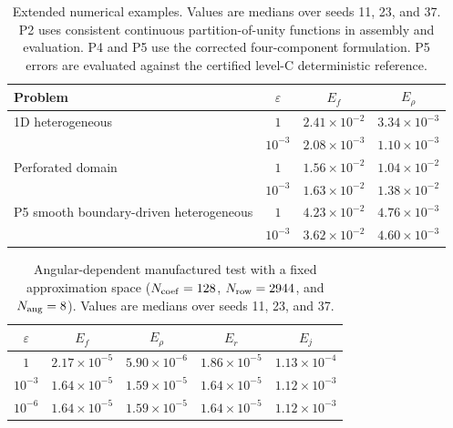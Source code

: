 \begin{table}[t]
\centering
\caption{Extended numerical examples. Values are medians over seeds 11, 23, and 37. P2 uses consistent continuous partition-of-unity functions in assembly and evaluation. P4 and P5 use the corrected four-component formulation. P5 errors are evaluated against the certified level-C deterministic reference.}
\label{tab:extended}
\begin{tabular}{lccc}
\toprule
Problem & $\varepsilon$ & $E_f$ & $E_\rho$\\
\midrule
1D heterogeneous & $1$ & $2.41\times10^{-2}$ & $3.34\times10^{-3}$\\
 & $10^{-3}$ & $2.08\times10^{-3}$ & $1.10\times10^{-3}$\\
\midrule
Perforated domain & $1$ & $1.56\times10^{-2}$ & $1.04\times10^{-2}$\\
 & $10^{-3}$ & $1.63\times10^{-2}$ & $1.38\times10^{-2}$\\
\midrule
P5 smooth boundary-driven heterogeneous & $1$ & $4.23\times10^{-2}$ & $4.76\times10^{-3}$\\
 & $10^{-3}$ & $3.62\times10^{-2}$ & $4.60\times10^{-3}$\\
\bottomrule
\end{tabular}
\end{table}

\begin{table}[t]
\centering
\caption{Angular-dependent manufactured test with a fixed approximation space ($N_{\rm coef}=128$, $N_{\rm row}=2944$, and $N_{\rm ang}=8$). Values are medians over seeds 11, 23, and 37.}
\label{tab:angular-manufactured}
\begin{tabular}{ccccc}
\toprule
$\varepsilon$ & $E_f$ & $E_\rho$ & $E_r$ & $E_j$\\
\midrule
$1$ & $2.17\times10^{-5}$ & $5.90\times10^{-6}$ & $1.86\times10^{-5}$ & $1.13\times10^{-4}$\\
$10^{-3}$ & $1.64\times10^{-5}$ & $1.59\times10^{-5}$ & $1.64\times10^{-5}$ & $1.12\times10^{-3}$\\
$10^{-6}$ & $1.64\times10^{-5}$ & $1.59\times10^{-5}$ & $1.64\times10^{-5}$ & $1.12\times10^{-3}$\\
\bottomrule
\end{tabular}
\end{table}

